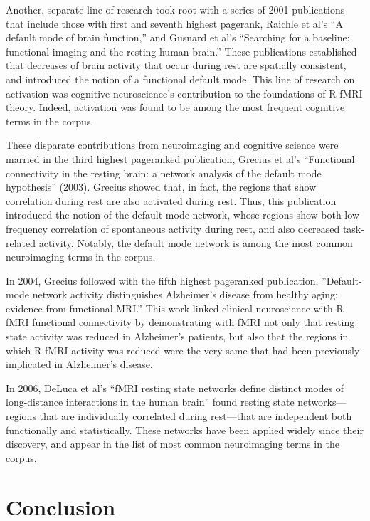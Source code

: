 \documentclass[5p]{elsarticle}
\begin{document}
Another, separate line of research took root with a series of 2001
publications that include those with first and seventh highest pagerank,
Raichle et al’s ``A default mode of brain function,'' and Gusnard et al’s
``Searching for a baseline: functional imaging and the resting human
brain.'' These publications established that decreases of brain activity
that occur during rest are spatially consistent, and introduced the notion
of a functional default mode. This line of research on activation was
cognitive neuroscience’s contribution to the foundations of R-fMRI theory.
Indeed, activation was found to be among the most frequent cognitive terms
in the corpus.

These disparate contributions from neuroimaging and cognitive science were
married in the third highest pageranked publication, Grecius et al’s
``Functional connectivity in the resting brain: a network analysis of the
default mode hypothesis'' (2003). Grecius showed that, in fact, the
regions that show correlation during rest are also activated during rest.
Thus, this publication introduced the notion of the default mode network,
whose regions show both low frequency correlation of spontaneous activity
during rest, and also decreased task-related activity. Notably, the
default mode network is among the most common neuroimaging terms in the
corpus.

In 2004, Grecius followed with the fifth highest pageranked publication,
''Default-mode network activity distinguishes Alzheimer’s disease from
healthy aging: evidence from functional MRI.'' This work linked clinical
neuroscience with R-fMRI functional connectivity by demonstrating with
fMRI not only that resting state activity was reduced in Alzheimer’s
patients, but also that the regions in which R-fMRI activity was reduced
were the very same that had been previously implicated in Alzheimer’s
disease. 

In 2006, DeLuca et al’s ``fMRI resting state networks define distinct
modes of long-distance interactions in the human brain'' found resting
state networks—regions that are individually correlated during rest—that
are independent both functionally and statistically. These networks have
been applied widely since their discovery, and appear in the list of most
common neuroimaging terms in the corpus.

\section{Conclusion}
\end{document}
